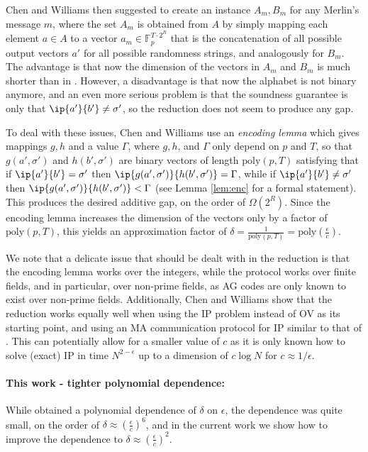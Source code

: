 \documentclass[11pt]{article}
\theoremstyle{plain}
\theoremstyle{remark}
\newcommand{\F}{\mathbb{F}}
\newcommand{\poly}{\mathrm{poly}}
\begin{document}
Chen and Williams then suggested to create an instance $A_m, B_m$  for any Merlin's message $m$, where the set $A_m$  is obtained from $A$ by simply mapping each element $a \in A$ to a vector $a_m \in \F_p^{T \cdot 2^R}$ that is the concatenation of all possible output vectors $a'$ for all possible randomness strings, and analogously for $B_m$. The advantage is that now 
the dimension of the vectors in $A_m$ and $B_m$ is much shorter than in  
\cite{Rub18}. However,  a disadvantage is that now the alphabet is not binary anymore, and an even more serious problem is that the soundness guarantee is only that $\ip {a'} {b'} \neq \sigma'$, so the reduction does not seem to produce any gap.


To deal with these issues, Chen and Williams use an \emph{encoding lemma} which gives mappings $g,h$ and a value $\Gamma$, where $g,h$, and $\Gamma$ only depend on $p$ and $T$, so that $g(a',\sigma')$ and $h(b',\sigma')$ are binary vectors of length $\poly(p, T)$ satisfying that if $\ip {a'} {b'} = \sigma'$ then $\ip {g(a',\sigma')} {h(b',\sigma')} =\Gamma$, while if $\ip {a'} {b'} \neq \sigma'$ then $\ip {g(a',\sigma')} {h(b',\sigma')} < \Gamma$ (see Lemma \ref{lem:enc} for a formal statement). This produces the desired additive gap, on the order of $\Omega(2^R)$. Since the encoding lemma increases the dimension of the vectors only by a factor of $\poly(p,T)$, this yields an approximation factor of $\delta =\frac{1} {\poly(p,T)}=  \poly(\frac \epsilon c)$.

We note that a delicate issue that should be dealt with in the reduction is that the encoding lemma works over the integers, while the protocol works over finite fields, and in particular, over non-prime fields, as AG codes are only known to exist over non-prime fields. Additionally, Chen and Williams show that the reduction works equally well when using the IP problem instead of OV as its starting point, and using an MA communication protocol for IP similar to that of \cite{AW09}. This can potentially allow for a smaller value of $c$ as it is only known how to solve (exact) IP in time 
 $N^{2-\epsilon}$ up to a dimension of $c \log N$ for $c \approx 1/\epsilon$. 


\paragraph{This work - tighter polynomial dependence:} While \cite{CW19} obtained a polynomial dependence of $\delta$ on $\epsilon$, the dependence was quite small, on the order of $\delta \approx  (\frac \epsilon c)^6$, and in the current work we show how to improve the dependence to $\delta \approx (\frac  \epsilon c)^2$.
\end{document}
